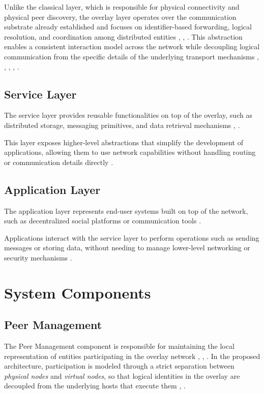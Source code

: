 \documentclass[
  12pt,
  oneside,
  a4paper,
  chapter=TITLE,
  section=TITLE,
  english,
  brazil
]{abntex2}
\begin{document}
Unlike the classical layer, which is responsible for physical connectivity and physical
peer discovery, the overlay layer operates over the communication substrate already
established and focuses on identifier-based forwarding, logical resolution, and
coordination among distributed entities \cite{li2022unreachable}, \cite{augustine2022byzantine}, \cite{qian2016garlic}. This abstraction enables a consistent
interaction model across the network while decoupling logical communication from
the specific details of the underlying transport mechanisms \cite{stoica2001chord}, \cite{maymounkov2002kademlia}, \cite{rowstron2001pastry}, \cite{augustine2022byzantine}, \cite{mirzaei2018pk}.

\subsection{Service Layer}

The service layer provides reusable functionalities on top of the overlay, such as distributed storage, messaging primitives, and data retrieval mechanisms \cite{augustine2022byzantine}, \cite{qian2016garlic}.

This layer exposes higher-level abstractions that simplify the development of applications, allowing them to use network capabilities without handling routing or communication details directly \cite{augustine2022byzantine}.

\subsection{Application Layer}

The application layer represents end-user systems built on top of the network, such as decentralized social platforms or communication tools \cite{augustine2022byzantine}.

Applications interact with the service layer to perform operations such as sending messages or storing data, without needing to manage lower-level networking or security mechanisms \cite{augustine2022byzantine}.


\section{System Components}
\subsection{Peer Management}

The Peer Management component is responsible for maintaining the local representation of entities participating in the overlay network \cite{augustine2022byzantine}, \cite{mirzaei2018pk}, \cite{qian2016garlic}. In the proposed architecture, participation is modeled through a strict separation between \textit{physical nodes} and \textit{virtual nodes}, so that logical identities in the overlay are decoupled from the underlying hosts that execute them \cite{li2022unreachable}, \cite{mirzaei2018pk}.
\end{document}
